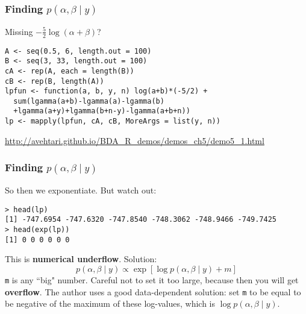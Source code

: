 \documentclass{beamer}
\begin{document}
\begin{frame}[fragile]
\frametitle{Finding $p(\alpha,\beta \mid y)$ }

Missing $- \frac{5}{2} \log (\alpha + \beta)$?
\begin{verbatim}
A <- seq(0.5, 6, length.out = 100)
B <- seq(3, 33, length.out = 100)
cA <- rep(A, each = length(B))
cB <- rep(B, length(A))
lpfun <- function(a, b, y, n) log(a+b)*(-5/2) +
  sum(lgamma(a+b)-lgamma(a)-lgamma(b)
  +lgamma(a+y)+lgamma(b+n-y)-lgamma(a+b+n))
lp <- mapply(lpfun, cA, cB, MoreArgs = list(y, n))
\end{verbatim}


\url{http://avehtari.github.io/BDA_R_demos/demos_ch5/demo5_1.html}

\end{frame}


\begin{frame}[fragile]
\frametitle{Finding $p(\alpha,\beta \mid y)$ }

So then we exponentiate. But watch out: 
\begin{verbatim}
> head(lp)
[1] -747.6954 -747.6320 -747.8540 -748.3062 -748.9466 -749.7425
> head(exp(lp))
[1] 0 0 0 0 0 0
\end{verbatim}
\pause

This is {\bf numerical underflow}. Solution:
\[
p(\alpha, \beta \mid y) \propto \exp[\log p(\alpha, \beta \mid y) + m]
\]
\verb|m| is any ``big" number. Careful not to set it too large, because then you will get {\bf overflow}. The author uses a good data-dependent solution: set \verb|m| to be equal to be negative of the maximum of these log-values, which is $\log p(\alpha, \beta \mid y)$. 

\end{frame}
\end{document}

